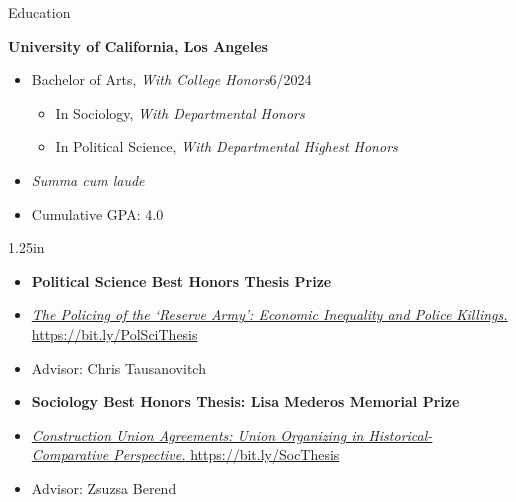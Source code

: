 \documentclass[12pt]{resume} %
\newcommand{\righthandindent}{1.25in}
\begin{document}
\thispagestyle{firstpagestyle}
\raggedright
\begin{rSection}{Education}
\begin{adjustwidth}{0pt}{0pt}
\textbf{University of California, Los Angeles}
\begin{itemize}
\vspace{-7pt}
    \item[]Bachelor of Arts, \textit{With College Honors}\hfill{}6/2024
    \begin{itemize}
    \vspace{-7pt}
    \item[] In Sociology, \textit{With Departmental Honors}
    \vspace{-7pt}
    \item[] In Political Science, \textit{With Departmental Highest Honors}
    \end{itemize}
    \item[] \textit{Summa cum laude}
    \vspace{-7pt}
    \item[]  Cumulative GPA: 4.0
    \end{itemize}
\begin{adjustwidth}{0pt}{\righthandindent}
\begin{itemize}
    \vspace{0pt}
    \item[] \textbf{Political Science Best Honors Thesis Prize}
    \vspace{-7pt}
    \item[] \href{https://bit.ly/PolSciThesis}{\textit{The Policing of the `Reserve Army': Economic Inequality and Police Killings.} https://bit.ly/PolSciThesis}
    \vspace{-7pt}
    \item[] Advisor: Chris Tausanovitch
    \item[] \textbf{Sociology Best Honors Thesis: Lisa Mederos Memorial Prize}
    \vspace{-21pt}
    \item[] \href{https://bit.ly/SocThesis}{\textit{Construction Union Agreements: Union Organizing in Historical- \allowbreak{}Comparative Perspective.} https://bit.ly/SocThesis}
    \vspace{-7pt}
    \item[] Advisor: Zsuzsa Berend


\end{itemize}
\end{adjustwidth}
\end{adjustwidth}
\end{rSection}
\end{document}
